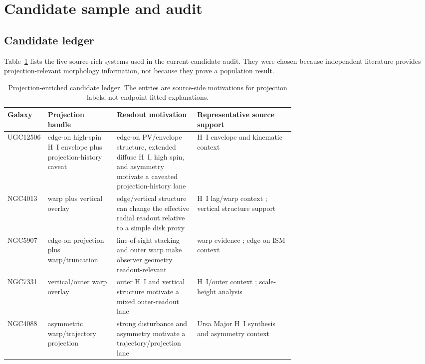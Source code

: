 \documentclass[11pt]{article}
\begin{document}
\section{Candidate sample and audit}
\label{sec:candidate-audit}

\subsection{Candidate ledger}

Table~\ref{tab:candidate-ledger} lists the five source-rich systems used in the
current candidate audit.  They were chosen because independent literature
provides projection-relevant morphology information, not because they prove a
population result.

\begin{table}[H]
\centering
\small
\begin{tabularx}{\linewidth}{p{0.14\linewidth}p{0.24\linewidth}p{0.29\linewidth}X}
\toprule
Galaxy & Projection handle & Readout motivation & Representative source support \\
\midrule
UGC12506 & edge-on high-spin H~I envelope plus projection-history caveat &
edge-on PV/envelope structure, extended diffuse H~I, high spin, and asymmetry
motivate a caveated projection-history lane &
H~I envelope and kinematic context
\cite{Hallenbeck2014HIghMassUGC12506} \\
NGC4013 & warp plus vertical overlay & edge/vertical structure can change the
effective radial readout relative to a simple disk proxy &
H~I lag/warp context \cite{ZschaechnerRand2015NGC4013HI}; vertical structure
support \cite{Comeron2011NGC4013Vertical} \\
NGC5907 & edge-on projection plus warp/truncation & line-of-sight stacking and
outer warp make observer geometry readout-relevant &
warp evidence \cite{Sasaki1987NGC5907Warp,Shang1998NGC5907Warp}; edge-on ISM
context \cite{Wiegert2015EdgeOnISM} \\
NGC7331 & vertical/outer warp overlay & outer H~I and vertical structure
motivate a mixed outer-readout lane &
H~I/outer context \cite{Bosma1978NGC7331HI}; scale-height analysis
\cite{Patra2018NGC7331ScaleHeight} \\
NGC4088 & asymmetric warp/trajectory projection & strong disturbance and
asymmetry motivate a trajectory/projection lane &
Ursa Major H~I synthesis and asymmetry context
\cite{VerheijenSancisi2001UrsaMajorHI} \\
\bottomrule
\end{tabularx}
\caption{Projection-enriched candidate ledger.  The entries are source-side
motivations for projection labels, not endpoint-fitted explanations.}
\label{tab:candidate-ledger}
\end{table}
\end{document}
